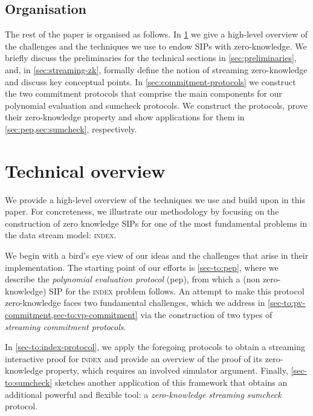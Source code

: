\documentclass[a4paper,UKenglish,cleveref, autoref, thm-restate]{lipics-v2021}
\theoremstyle{definition}
\newcommand{\indexproblem}{\normalfont\textsc{index}\xspace}
\newcommand{\pepprotocol}{\textsf{pep}\xspace}
\begin{document}
\subsection*{Organisation}
    
    The rest of the paper is organised as follows. In \cref{sec:technical-overview} we give a high-level overview of the challenges and the techniques we use to endow SIPs with zero-knowledge. We briefly discuss the preliminaries for the technical sections in \cref{sec:preliminaries}, and, in \cref{sec:streaming-zk}, formally define the notion of streaming zero-knowledge and discuss key conceptual points. In \cref{sec:commitment-protocols} we construct the two commitment protocols that comprise the main components for our polynomial evaluation and sumcheck protocols. We construct the protocols, prove their zero-knowledge property and show applications for them in \cref{sec:pep,sec:sumcheck}, respectively.

\section{Technical overview}
    \label{sec:technical-overview}
    
    We provide a high-level overview of the techniques we use and build upon in this paper. For concreteness, we illustrate our methodology by focusing on the construction of zero knowledge SIPs for one of the most fundamental problems in the data stream model: \indexproblem.
    
    We begin with a bird's eye view of our ideas and the challenges that arise in their implementation. The starting point of our efforts is \cref{sec-to:pep}, where we describe the \emph{polynomial evaluation protocol} (\pepprotocol), from which a (non zero-knowledge) SIP for the \indexproblem problem follows.
    An attempt to make this protocol zero-knowledge faces two fundamental challenges, which we address in \cref{sec-to:pv-commitment,sec-to:vp-commitment} via the construction of two types of \emph{streaming commitment protocols}.
    
    In \cref{sec-to:index-protocol}, we apply the foregoing protocols to obtain a streaming interactive proof for \indexproblem and provide an overview of the proof of its zero-knowledge property, which requires an involved simulator argument. Finally, \cref{sec-to:sumcheck} sketches another application of this framework that obtains an additional powerful and flexible tool: a \emph{zero-knowledge streaming sumcheck} protocol.
    
\end{document}
